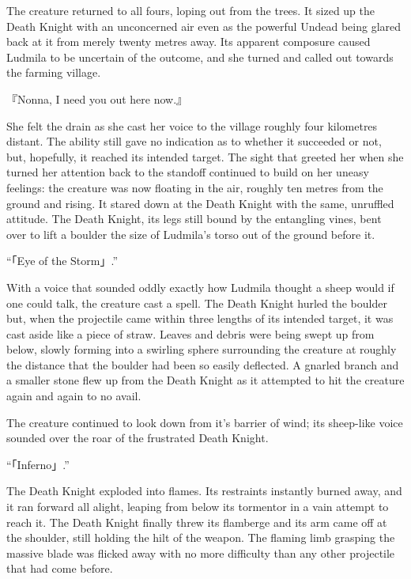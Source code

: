  

The creature returned to all fours, loping out from the trees. It sized up the Death Knight with an unconcerned air even as the powerful Undead being glared back at it from merely twenty metres away. Its apparent composure caused Ludmila to be uncertain of the outcome, and she turned and called out towards the farming village.

 

『Nonna, I need you out here now.』

 

She felt the drain as she cast her voice to the village roughly four kilometres distant. The ability still gave no indication as to whether it succeeded or not, but, hopefully, it reached its intended target. The sight that greeted her when she turned her attention back to the standoff continued to build on her uneasy feelings: the creature was now floating in the air, roughly ten metres from the ground and rising. It stared down at the Death Knight with the same, unruffled attitude. The Death Knight, its legs still bound by the entangling vines, bent over to lift a boulder the size of Ludmila’s torso out of the ground before it.

 

“「Eye of the Storm」.”

 

With a voice that sounded oddly exactly how Ludmila thought a sheep would if one could talk, the creature cast a spell. The Death Knight hurled the boulder but, when the projectile came within three lengths of its intended target, it was cast aside like a piece of straw. Leaves and debris were being swept up from below, slowly forming into a swirling sphere surrounding the creature at roughly the distance that the boulder had been so easily deflected. A gnarled branch and a smaller stone flew up from the Death Knight as it attempted to hit the creature again and again to no avail.

 

The creature continued to look down from it’s barrier of wind; its sheep-like voice sounded over the roar of the frustrated Death Knight.

 

“「Inferno」.”

 

The Death Knight exploded into flames. Its restraints instantly burned away, and it ran forward all alight, leaping from below its tormentor in a vain attempt to reach it. The Death Knight finally threw its flamberge and its arm came off at the shoulder, still holding the hilt of the weapon. The flaming limb grasping the massive blade was flicked away with no more difficulty than any other projectile that had come before.

